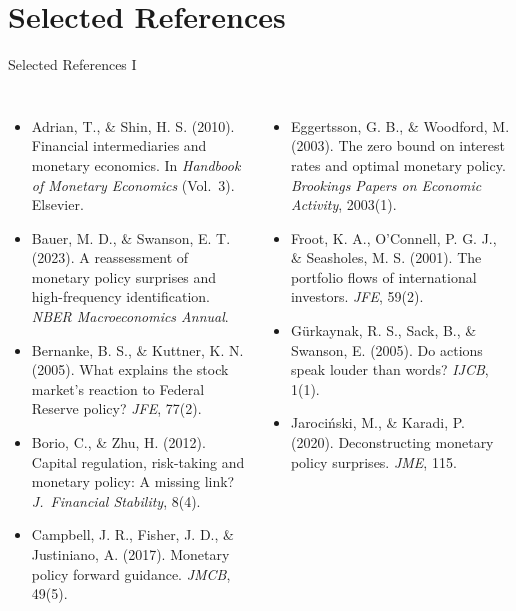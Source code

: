 \documentclass[aspectratio=169, 11pt]{beamer}
\begin{document}
\section{Selected References}

\begin{frame}{Selected References I}
  \footnotesize
  \begin{columns}[T]
    \begin{itemize}
      \item Adrian, T., \& Shin, H. S. (2010). Financial intermediaries and monetary economics. In \textit{Handbook of Monetary Economics} (Vol.~3). Elsevier.
      \item Bauer, M. D., \& Swanson, E. T. (2023). A reassessment of monetary policy surprises and high-frequency identification. \textit{NBER Macroeconomics Annual}.
      \item Bernanke, B. S., \& Kuttner, K. N. (2005). What explains the stock market's reaction to Federal Reserve policy? \textit{JFE}, 77(2).
      \item Borio, C., \& Zhu, H. (2012). Capital regulation, risk-taking and monetary policy: A missing link? \textit{J.\ Financial Stability}, 8(4).
      \item Campbell, J. R., Fisher, J. D., \& Justiniano, A. (2017). Monetary policy forward guidance. \textit{JMCB}, 49(5).
    \end{itemize}

    \begin{itemize}
      \item Eggertsson, G. B., \& Woodford, M. (2003). The zero bound on interest rates and optimal monetary policy. \textit{Brookings Papers on Economic Activity}, 2003(1).
      \item Froot, K. A., O'Connell, P. G. J., \& Seasholes, M. S. (2001). The portfolio flows of international investors. \textit{JFE}, 59(2).
      \item G\"urkaynak, R. S., Sack, B., \& Swanson, E. (2005). Do actions speak louder than words? \textit{IJCB}, 1(1).
      \item Jaroci\'nski, M., \& Karadi, P. (2020). Deconstructing monetary policy surprises. \textit{JME}, 115.
    \end{itemize}
  \end{columns}
\end{frame}
\end{document}
